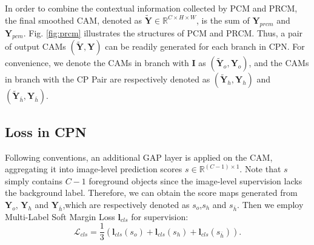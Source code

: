\documentclass[10pt,twocolumn,letterpaper]{article}
\begin{document}
In order to combine the contextual information collected by PCM and PRCM, the final smoothed CAM, denoted as $\widetilde {\boldsymbol{Y}} \in {\mathbb{R}^{C \times H \times W}}$, is the sum of $\boldsymbol{Y}_{prcm}$ and $\boldsymbol{Y}_{pcm}$. Fig. \ref{fig:prcm} illustrates the structures of PCM and PRCM. Thus, a pair of output CAMs $(\widetilde {\boldsymbol{Y}},\boldsymbol{Y})$ can be readily generated for each branch in CPN. For convenience, we denote the CAMs in branch with $\boldsymbol{I}$ as $(\widetilde {\boldsymbol{Y}}_{o},\boldsymbol {Y}_{o})$, and the CAMs in branch with the CP Pair are respectively denoted as $(\widetilde {\boldsymbol{Y}}_{h},\boldsymbol{Y}_h)$ and $(\widetilde {\boldsymbol{Y}}_{\overline h},\boldsymbol{Y}_{\overline h})$.
\subsection{Loss in CPN}
Following conventions, an additional GAP layer is applied on the CAM, aggregating it into image-level prediction scores $s \in \mathbb{R}^{(C-1) \times 1}$. Note that $s$ simply contains $C-1$ foreground objects since the image-level supervision lacks the background label. Therefore, we can obtain the score maps generated from $\boldsymbol{Y}_o$, $\boldsymbol{Y}_h$ and $\boldsymbol{Y}_{\overline h}$,which are respectively denoted as $s_o$,$s_h$ and $s_{\overline h}$. Then we employ Multi-Label Soft Margin Loss $\boldsymbol{l}_{cls}$ for supervision:
\begin{equation}\label{n_cls}
\mathcal {L}_{cls} =\frac{1} {3}(\boldsymbol{l}_{cls}(s_o) + \boldsymbol{l}_{cls}(s_h) + \boldsymbol{l}_{cls}(s_{\overline h})).
\end{equation}
\end{document}
